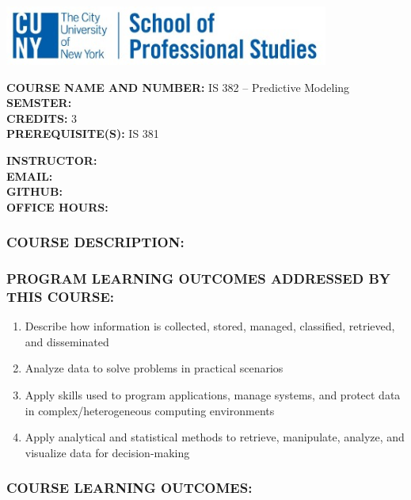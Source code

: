 \documentclass[
  letterpaper,
  DIV=11,
  numbers=noendperiod]{scrartcl}
\author{}
\date{}
\providecommand{\tightlist}{%
  \setlength{\itemsep}{0pt}\setlength{\parskip}{0pt}}\usepackage{longtable,booktabs,array}
\begin{document}
\begin{center}
\includegraphics[width=0.8\textwidth,height=\textheight]{../images/sps_logo.jpg}
\end{center}

\textbf{COURSE NAME AND NUMBER:} IS 382 -- Predictive Modeling\\
\textbf{SEMSTER:}\\
\textbf{CREDITS:} 3\\
\textbf{PREREQUISITE(S):} IS 381

\textbf{INSTRUCTOR:}\\
\textbf{EMAIL:}\\
\textbf{GITHUB:}\\
\textbf{OFFICE HOURS:}

\subsubsection{COURSE DESCRIPTION:}\label{course-description}

\subsubsection{PROGRAM LEARNING OUTCOMES ADDRESSED BY THIS
COURSE:}\label{program-learning-outcomes-addressed-by-this-course}

\begin{enumerate}
\def\labelenumi{\arabic{enumi}.}
\tightlist
\item
  Describe how information is collected, stored, managed, classified,
  retrieved, and disseminated
\item
  Analyze data to solve problems in practical scenarios
\item
  Apply skills used to program applications, manage systems, and protect
  data in complex/heterogeneous computing environments\\
\item
  Apply analytical and statistical methods to retrieve, manipulate,
  analyze, and visualize data for decision-making
\end{enumerate}

\subsubsection{COURSE LEARNING
OUTCOMES:}\label{course-learning-outcomes}
\end{document}
